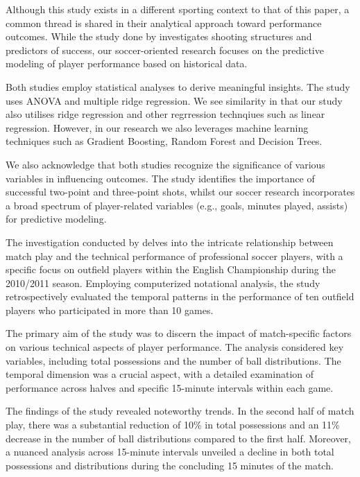 \documentclass[12pt]{article}
\begin{document}
Although this study exists in a different sporting context to that of this paper,
a common thread is shared in their analytical approach toward performance outcomes.
While the study done by \citet{gryko2018structural}
investigates shooting structures and predictors of success, our soccer-oriented
research focuses on the predictive modeling of player performance based on
historical data.

Both studies employ statistical analyses to derive meaningful insights.
The \citet{gryko2018structural} study uses ANOVA and multiple ridge regression.
We see similarity in that our study also utilises ridge regression and other
regrression technqiues such as linear regression. However, in our research we also 
leverages machine learning techniques such as  Gradient Boosting, Random Forest
and Decision Trees.

We also acknowledge that both studies recognize the significance of various
variables in influencing outcomes.
The \citet{gryko2018structural} study identifies the importance of successful
two-point and three-point shots, whilst our soccer research incorporates a broad
spectrum of player-related variables (e.g., goals, minutes played, assists) for
predictive modeling.



The investigation conducted by \citet{russell2013technical} delves into
the intricate relationship between match play and the technical performance of
professional soccer players, with a specific focus on outfield players within the
English Championship during the 2010/2011 season. Employing computerized
notational analysis, the study retrospectively evaluated the temporal patterns
in the performance of ten outfield players who participated in more than 10 games.

The primary aim of the study was to discern the impact of match-specific factors
on various technical aspects of player performance. The analysis considered key
variables, including total possessions and the number of ball distributions. The
temporal dimension was a crucial aspect, with a detailed examination of
performance across halves and specific 15-minute intervals within each game.

The findings of the study revealed noteworthy trends. In the second half of match
play, there was a substantial reduction of 10\% in total possessions and an 11\%
decrease in the number of ball distributions compared to the first half.
Moreover, a nuanced analysis across 15-minute intervals unveiled a decline in
both total possessions and distributions during the concluding 15 minutes of the
match.
\end{document}

